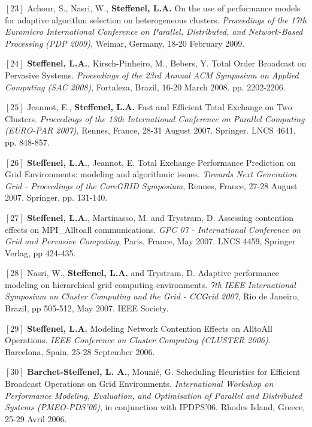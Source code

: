 \documentclass[final,twoside]{hdr} %
\begin{document}
\vspace{1em} \noindent $[23]$
Achour, S., Nasri, W., {\bf Steffenel, L.A.} {On the use of performance models for adaptive algorithm selection on heterogeneous clusters}. {\em Proceedings of the 17th Euromicro International Conference on Parallel, Distributed, and Network-Based Processing (PDP 2009)}, Weimar, Germany, 18-20 February 2009. 

\vspace{1em} \noindent $[24]$
{\bf Steffenel, L.A.}, Kirsch-Pinheiro, M., Bebers, Y. {Total Order Broadcast on Pervasive Systems}. {\em Proceedings of the 23rd Annual ACM Symposium on Applied Computing (SAC 2008)}, Fortaleza, Brazil, 16-20 March 2008. pp. 2202-2206. 

\vspace{1em} \noindent $[25]$
Jeannot, E., \textbf{Steffenel, L.A.} {Fast and Efficient Total Exchange on Two Clusters}. {\em Proceedings of the 13th International Conference on Parallel Computing (EURO-PAR 2007)}, Rennes, France, 28-31 August 2007. Springer. LNCS 4641, pp. 848-857. 

\vspace{1em} \noindent $[26]$
{\bf Steffenel, L.A.}, Jeannot, E. {Total Exchange Performance Prediction on Grid Environments: modeling and algorithmic issues}. {\em Towards Next Generation Grid - Proceedings of the CoreGRID Symposium}, Rennes, France, 27-28 August 2007. Springer, pp. 131-140.

\vspace{1em} \noindent $[27]$
{\bf Steffenel, L.A.}, Martinasso, M. and Trystram, D. {Assessing contention effects on MPI\_Alltoall communications}. {\em GPC 07 - International Conference on Grid and Pervasive Computing}, Paris, France, May 2007. LNCS 4459, Springer Verlag, pp 424-435.

\vspace{1em} \noindent $[28]$
Nasri, W., {\bf Steffenel, L.A.} and Trystram, D. {Adaptive performance modeling on hierarchical grid computing environments}. {\em 7th IEEE International Symposium on Cluster Computing and the Grid - CCGrid 2007}, Rio de Janeiro, Brazil, pp 505-512, May 2007. IEEE Society.

\vspace{1em} \noindent $[29]$
{\bf Steffenel, L.A.} {Modeling Network Contention Effects on AlltoAll Operations}. {\em IEEE Conference on Cluster Computing (CLUSTER 2006)}. Barcelona, Spain, 25-28 September 2006. 

\vspace{1em} \noindent $[30]$
\textbf{Barchet-Steffenel, L. A.}, Mounié, G. {Scheduling Heuristics for Efficient Broadcast Operations on Grid Environments}. {\em International Workshop on Performance Modeling, Evaluation, and Optimisation of Parallel and Distributed Systems (PMEO-PDS'06)}, in conjunction with IPDPS'06. Rhodes Island, Greece, 25-29 Avril 2006.
\end{document}
